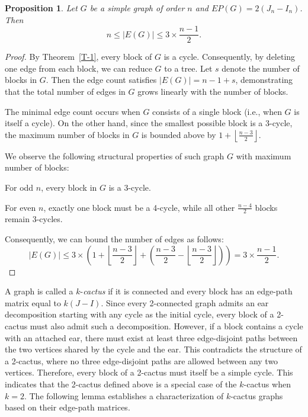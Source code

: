 \documentclass{article}
\newtheorem{proposition}[theorem]{Proposition}
\begin{document}
\begin{proposition}\label{MP-1}
Let $G$ be a simple graph of order $n$ and $EP(G) = 2(J_n-I_n)$. Then $$n\leq |E(G)|\leq 3\times\frac{n-1}{2}.$$
\end{proposition}
\begin{proof}
By Theorem~\ref{T-1}, every block of $G$ is a cycle. Consequently, by deleting one edge from each block, we can reduce $G$ to a tree. Let $s$ denote the number of blocks in $G$. Then the edge count satisfies $|E(G)| = n - 1 + s$, demonstrating that the total number of edges in $G$ grows linearly with the number of blocks.  

The minimal edge count occurs when $G$ consists of a single block (i.e., when $G$ is itself a cycle). On the other hand, since the smallest possible block is a 3-cycle, the maximum number of blocks in $G$ is bounded above by $1 + \left\lfloor \frac{n - 3}{2} \right\rfloor$.  

We observe the following structural properties of such graph $G$ with maximum number of blocks:

For odd $n$, every block in $G$ is a 3-cycle.

For even $n$, exactly one block must be a 4-cycle, while all other $ \frac{n-4}{2} $ blocks remain 3-cycles.

Consequently, we can bound the number of edges as follows:
\[
|E(G)| \leq 3 \times \left(1 + \left\lfloor \frac{n - 3}{2} \right\rfloor + \left(\frac{n - 3}{2} - \left\lfloor \frac{n - 3}{2} \right\rfloor\right)\right) = 3 \times \frac{n-1}{2}.
\]
\end{proof}

A graph is called a $k$-{\it cactus} if it is connected and every block has an edge-path matrix equal to $k(J-I)$. Since every 2-connected graph admits an ear decomposition starting with any cycle as the initial cycle, every block of a 2-cactus must also admit such a decomposition. However, if a block contains a cycle with an attached ear, there must exist at least three edge-disjoint paths between the two vertices shared by the cycle and the ear. This contradicts the structure of a 2-cactus, where no three edge-disjoint paths are allowed between any two vertices. Therefore, every block of a 2-cactus must itself be a simple cycle. This indicates that the 2-cactus defined above is a special case of the $k$-cactus when $k=2$. The following lemma establishes a characterization of $k$-cactus graphs based on their edge-path matrices.
\end{document}
